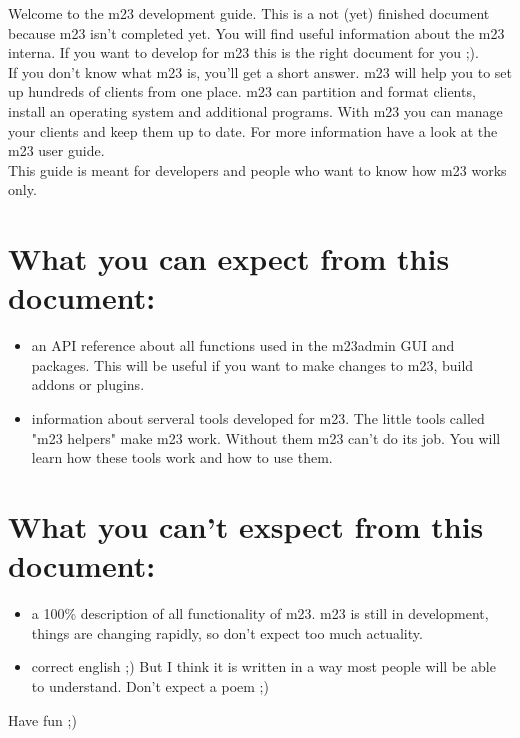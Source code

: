 Welcome to the m23 development guide. This is a not (yet) finished document because m23 isn't completed yet. You will find useful information about the m23 interna. If you want to develop for m23 this is the right document for you ;).\\
If you don't know what m23 is, you'll get a short answer. m23 will help you to set up hundreds of clients from one place. m23 can partition and format clients, install an operating system and additional programs. With m23 you can manage your clients and keep them up to date. For more information have a look at the m23 user guide.\\
This guide is meant for developers and people who want to know how m23 works only.
\section{What you can expect from this document:}
\begin{itemize}
\item an API reference about all functions used in the m23admin GUI and packages. This will be useful if you want to make changes to m23, build addons or plugins.
\item information about serveral tools developed for m23. The little tools called "m23 helpers" make m23 work. Without them m23 can't do its job. You will learn how these tools work and how to use them.
\end{itemize}
\section{What you can't exspect from this document:}
\begin{itemize}
\item a 100\% description of all functionality of m23. m23 is still in development, things are changing rapidly, so don't expect too much actuality.
\item correct english ;) But I think it is written in a way most people will be able to understand. Don't expect a poem ;)
\end{itemize}
Have fun ;)
